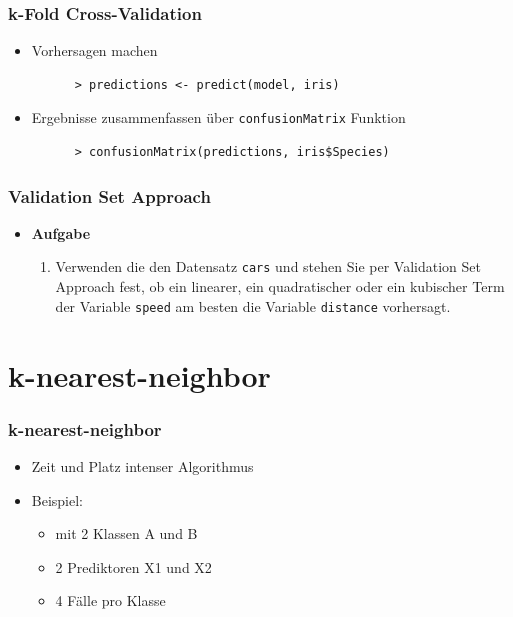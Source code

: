 \documentclass{beamer}
\begin{document}
\begin{frame}[fragile]
  \frametitle{k-Fold Cross-Validation}
  \begin{itemize}
    \item Vorhersagen machen
    \begin{Verbatim}
      > predictions <- predict(model, iris)
    \end{Verbatim}
    \item Ergebnisse zusammenfassen über \Verb+confusionMatrix+ Funktion
    \begin{Verbatim}
      > confusionMatrix(predictions, iris$Species)
    \end{Verbatim}
  \end{itemize}
\end{frame}

\begin{frame}[fragile]
  \frametitle{Validation Set Approach}
  \begin{itemize}
    \item \textbf{Aufgabe} \\ 
         \begin{enumerate}
      		\item Verwenden die den Datensatz \Verb+cars+ und stehen Sie per Validation Set Approach fest, ob ein linearer, ein quadratischer oder ein kubischer Term der Variable \Verb+speed+ am besten die Variable \Verb+distance+ vorhersagt.
    \end{enumerate}
  \end{itemize}
\end{frame}

\section{k-nearest-neighbor}

\begin{frame}[fragile]
  \frametitle{k-nearest-neighbor}
  \begin{itemize}
    \item Zeit und Platz intenser Algorithmus
    \item Beispiel:
       \begin{itemize}
	\item mit 2 Klassen A und B
    \item 2 Prediktoren X1 und X2
    \item 4 Fälle pro Klasse
  \end{itemize}
  \end{itemize}
\end{frame}
\end{document}
